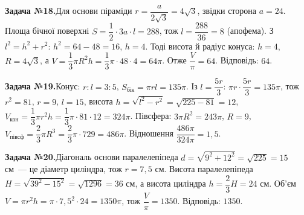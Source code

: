 \documentclass[12pt]{article}
\begin{document}
\par\vspace{0.3cm}\noindent\hypertarget{sol:18}{}
\begin{tcolorbox}[colback=titleBg!40, colframe=mainGreen!55, boxrule=0.4pt, arc=2pt, left=6pt, right=6pt, top=4pt, bottom=4pt, breakable]
\noindent\small\textbf{Задача №18.}\quad Для основи піраміди $r=\dfrac{a}{2\sqrt3}=4\sqrt3$, звідки сторона $a=24$. Площа бічної поверхні $S=\dfrac12\cdot 3a\cdot l=288$, тож $l=\dfrac{288}{36}=8$ (апофема). З $l^2=h^2+r^2$: $h^2=64-48=16$, $h=4$. Тоді висота й радіус конуса: $h=4$, $R=4\sqrt3$, а $V=\dfrac13\pi R^2 h=\dfrac13\pi\cdot48\cdot4=64\pi$. Отже $\dfrac{V}{\pi}=64$. Відповідь: \textbf{$64$}.
\par\vspace{0.1cm}\hfill\hyperlink{task:18}{}
\end{tcolorbox}
\par\vspace{0.3cm}\noindent\hypertarget{sol:19}{}
\begin{tcolorbox}[colback=titleBg!40, colframe=mainGreen!55, boxrule=0.4pt, arc=2pt, left=6pt, right=6pt, top=4pt, bottom=4pt, breakable]
\noindent\small\textbf{Задача №19.}\quad Конус: $r:l=3:5$, $S_{\text{бік}}=\pi rl=135\pi$. Із $l=\dfrac{5r}{3}$: $\pi r\cdot\dfrac{5r}{3}=135\pi$, тож $r^2=81$, $r=9$, $l=15$, висота $h=\sqrt{l^2-r^2}=\sqrt{225-81}=12$, $V_{\text{кон}}=\dfrac13\pi r^2h=\dfrac13\pi\cdot81\cdot12=324\pi$. Півсфера: $3\pi R^2=243\pi$, $R=9$, $V_{\text{півсф}}=\dfrac23\pi R^3=\dfrac23\pi\cdot729=486\pi$. Відношення $\dfrac{486\pi}{324\pi}=1{,}5$.
\par\vspace{0.1cm}\hfill\hyperlink{task:19}{}
\end{tcolorbox}
\par\vspace{0.3cm}\noindent\hypertarget{sol:20}{}
\begin{tcolorbox}[colback=titleBg!40, colframe=mainGreen!55, boxrule=0.4pt, arc=2pt, left=6pt, right=6pt, top=4pt, bottom=4pt, breakable]
\noindent\small\textbf{Задача №20.}\quad Діагональ основи паралелепіпеда $d = \sqrt{9^2+12^2} = \sqrt{225} = 15$ см~--- це діаметр циліндра, тож $r = 7{,}5$ см. Висота паралелепіпеда $H = \sqrt{39^2 - 15^2} = \sqrt{1296} = 36$ см, а висота циліндра $h = \dfrac23 H = 24$ см. Об'єм $V = \pi r^2 h = \pi\cdot 7{,}5^2\cdot 24 = 1350\pi$, тож $\dfrac{V}{\pi} = 1350$. Відповідь: \textbf{$1350$}.
\par\vspace{0.1cm}\hfill\hyperlink{task:20}{}
\end{tcolorbox}
\end{document}
